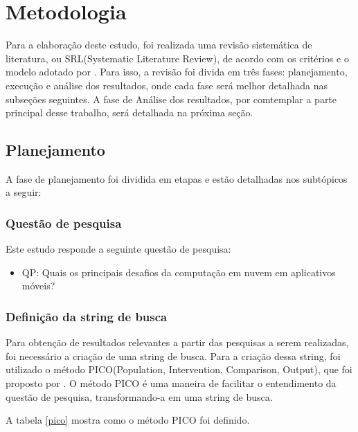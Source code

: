 \documentclass[12pt]{article}
\begin{document}
\section{Metodologia}

Para a elaboração deste estudo, foi realizada uma revisão sistemática de literatura,
ou SRL(Systematic Literature Review), de acordo com os critérios e o modelo adotado 
por \cite{kitchenham2012}. Para isso, a revisão foi divida em três fases: planejamento,
execução e análise dos resultados, onde cada fase será melhor detalhada nas subseções seguintes.
A fase de Análise dos resultados, por comtemplar a parte principal desse trabalho, será detalhada
na próxima seção.

\subsection{Planejamento}

A fase de planejamento foi dividida em etapas e estão detalhadas nos subtópicos a seguir:

\subsubsection{Questão de pesquisa}

Este estudo responde a seguinte questão de pesquisa:

\begin{itemize}
  \item QP: Quais os principais desafios da computação em nuvem em aplicativos móveis?
\end{itemize}

\subsubsection{Definição da string de busca}

Para obtenção de resultados relevantes a partir das pesquisas a serem realizadas, foi necessário a criação de uma string de busca.
Para a criação dessa string, foi utilizado o método PICO(Population, Intervention, Comparison, Output), que foi
proposto por \cite{SANTOS2007}. O método PICO é uma maneira de facilitar o entendimento da questão de pesquisa, transformando-a
em uma string de busca.

A tabela \ref{pico} mostra como o método PICO foi definido.
\end{document}
